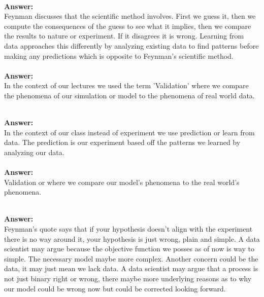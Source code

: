 \documentclass[12pt]{article}
\begin{document}
\begin{enumerate}


 \\ 
\textbf{Answer: } \\ 
Feynman discusses that the scientific method involves. First we guess it, then we compute the consequences of the guess to see what it implies, then we compare the results to nature or experiment. If it disagrees it is wrong. Learning from data approaches this differently by analyzing existing data to find patterns before making any predictions which is opposite to Feynman's scientific method. \\ 


\\
\textbf{Answer: } \\ 
In the context of our lectures we used the term 'Validation' where we compare the phenomena of our simulation or model to the phenomena of real world data. 

\\
\textbf{Answer:} \\ 
In the context of our class instead of experiment we use prediction or learn from data. The prediction is our experiment based off the patterns we learned by analyzing our data. \\

\\ 
\textbf{Answer: } \\
Validation or where we compare our model's phenomena to the real world's phenomena.

\\
\textbf{Answer: } \\ 
Feynman's quote says that if your hypothesis doesn't align with the experiment there is no way around it, your hypothesis is just wrong, plain and simple. A data scientist may argue because the objective function we posses as of now is way to simple. The necessary model maybe more complex. Another concern could be the data, it may just mean we lack data. A data scientist may argue that a process is not just binary right or wrong, there maybe more underlying reasons as to why our model could be wrong now but could be corrected looking forward. \\ 


\end{enumerate}
\end{document}
